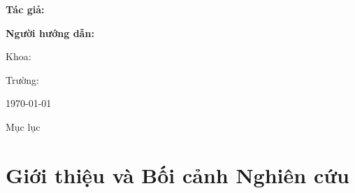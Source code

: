 
\begin{frame}
    \titlepage
\end{frame}

\begin{frame}
    \centering
    {\Large \textbf{Tác giả:} \TENTACGIA \par}
    {\Large \textbf{Người hướng dẫn:} \TENNGUOIHUONGDAN \par}
    \vspace{0.5cm}
    {\small Khoa: \KHOA \par}
    {\small Trường: \TRUONG \par}
    \vfill
    {\footnotesize \today}
\end{frame}

\begin{frame}{Mục lục}
    \tableofcontents
\end{frame}
\section{Giới thiệu và Bối cảnh Nghiên cứu}


